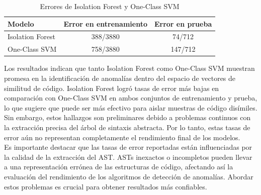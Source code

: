 \begin{table}[ht]
\centering
\begin{tabular}{lcc}
\toprule
\textbf{Modelo} & \textbf{Error en entrenamiento} & \textbf{Error en prueba} \\
\midrule
Isolation Forest & 388/3880 & 74/712 \\
One-Class SVM & 758/3880 & 147/712 \\
\bottomrule
\end{tabular}
\caption{Errores de Isolation Forest y One-Class SVM}
\label{tab:resultados}
\end{table}

Los resultados indican que tanto Isolation Forest como One-Class SVM muestran promesa en la identificación de anomalías dentro del espacio de vectores de similitud de código. Isolation Forest logró tasas de error más bajas en comparación con One-Class SVM en ambos conjuntos de entrenamiento y prueba, lo que sugiere que puede ser más efectivo para aislar muestras de código disímiles. Sin embargo, estos hallazgos son preliminares debido a problemas continuos con la extracción precisa del árbol de sintaxis abstracta. Por lo tanto, estas tasas de error aún no representan completamente el rendimiento final de los modelos.\\

Es importante destacar que las tasas de error reportadas están influenciadas por la calidad de la extracción del AST. ASTs inexactos o incompletos pueden llevar a una representación errónea de las estructuras de código, afectando así la evaluación del rendimiento de los algoritmos de detección de anomalías. Abordar estos problemas es crucial para obtener resultados más confiables.